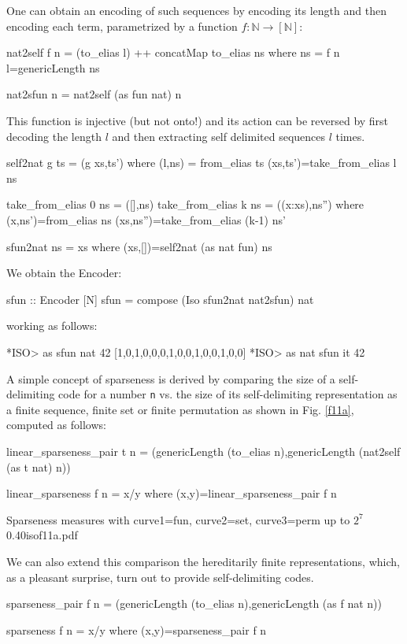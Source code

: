 \documentclass[]{INCLUDES/llncs}
\begin{document}
One can obtain an encoding of such sequences by encoding its length and then
encoding each term, parametrized by a function $f:\mathbb{N} \rightarrow [\mathbb{N}]$:
\begin{code}
nat2self f n = (to_elias l) ++ concatMap to_elias ns where
  ns = f n
  l=genericLength ns
  
nat2sfun n = nat2self (as fun nat) n   
\end{code}
This function is injective (but not onto!) and its action can be reversed
by first decoding the length $l$ and then extracting self delimited sequences 
$l$ times.
\begin{code}
self2nat g ts = (g xs,ts') where 
  (l,ns) = from_elias ts
  (xs,ts')=take_from_elias l ns

  take_from_elias 0 ns = ([],ns) 
  take_from_elias k ns = ((x:xs),ns'') where
     (x,ns')=from_elias ns
     (xs,ns'')=take_from_elias (k-1) ns'
  
sfun2nat ns = xs where
  (xs,[])=self2nat (as nat fun) ns
\end{code}
We obtain the Encoder:
\begin{code}
sfun :: Encoder [N]
sfun = compose (Iso sfun2nat nat2sfun) nat
\end{code}
working as follows:
\begin{codex}
*ISO> as sfun nat 42
[1,0,1,0,0,0,1,0,0,1,0,0,1,0,0]
*ISO> as nat sfun it
42
\end{codex}

A simple concept of sparseness is derived by comparing the size of a
self-delimiting code for a number {\tt n} vs. the size of its
self-delimiting representation as a finite sequence, finite set or  finite
permutation as shown in Fig. \ref{f11a}, computed as follows:
\begin{code}
linear_sparseness_pair t n = 
  (genericLength (to_elias n),genericLength (nat2self (as t nat) n))

linear_sparseness f n = x/y where (x,y)=linear_sparseness_pair f n 
\end{code}

{Sparseness measures with curve1=fun, curve2=set, curve3=perm up to $2^7$} 
{0.40}{isof11a.pdf}

We can also extend this comparison the hereditarily finite representations,
which, as a pleasant surprise,  turn out to provide self-delimiting codes.
\begin{code}
sparseness_pair f n = 
  (genericLength (to_elias n),genericLength (as f nat n))

sparseness f n = x/y where (x,y)=sparseness_pair f n 
\end{code}
\end{document}
